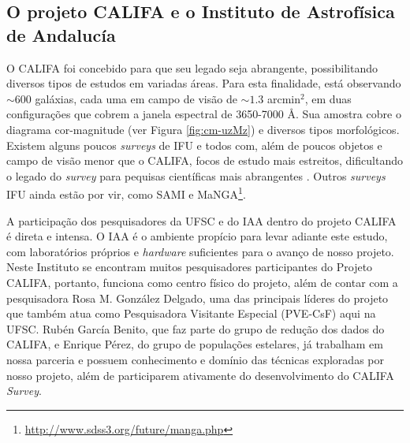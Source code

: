 \documentclass[a4paper,12pt]{article}
\begin{document}
\subsection{O projeto CALIFA e o Instituto de Astrofísica de Andalucía}
\vspace{0.3cm}
O CALIFA foi concebido para que seu legado seja abrangente, possibilitando diversos tipos de estudos em variadas áreas. Para esta finalidade, está
observando $\sim 600$ galáxias, cada uma em campo de visão de $\sim1.3$ arcmin$^2$, em duas configurações que cobrem a janela espectral de 3650-7000
\AA. Sua amostra cobre o diagrama cor-magnitude (ver Figura \ref{fig:cm-uzMz}) e diversos tipos morfológicos. Existem alguns poucos {\em surveys} de
IFU e todos com, além de poucos objetos e campo de visão menor que o CALIFA, focos de estudo mais estreitos, dificultando o legado do {\em survey} para
pequisas científicas mais abrangentes \citep[SAURON;][região central de 72 galáxias com $z < 0.01$.]{de-Zeeuw2002} \citep[PINGS;][algumas galáxias
muito próximas ($\sim 10$ Mpc) e o estudo atual de 70 (U)LIRGs com $z <0.26$]{RosalesOrtega2010} \citep[VENGA;][$30$ galáxias espirais]{Blanc2010}
\citep[ATLAS\textsuperscript{3D};][260 galáxias {\em early-type} próximas]{Cappellari2011}. Outros {\em surveys} IFU ainda estão por vir, como SAMI
\citep{Croom2012} e MaNGA\footnote{\url{http://www.sdss3.org/future/manga.php}}.

A participação dos pesquisadores da UFSC e do IAA dentro do projeto CALIFA é direta e intensa. O IAA é o ambiente propício para levar adiante este
estudo, com laboratórios próprios e {\em hardware} suficientes para o avanço de nosso projeto. Neste Instituto se encontram muitos pesquisadores
participantes do Projeto CALIFA, portanto, funciona como centro físico do projeto, além de contar com a pesquisadora Rosa M. González Delgado, uma das
principais líderes do projeto que também atua como Pesquisadora Visitante Especial (PVE-CsF) aqui na UFSC. Rubén García Benito, que faz parte do grupo
de redução dos dados do CALIFA, e Enrique Pérez, do grupo de populações estelares, já trabalham em nossa parceria e possuem conhecimento e domínio das
técnicas exploradas por nosso projeto, além de participarem ativamente do desenvolvimento do CALIFA {\em Survey}.
\end{document}
